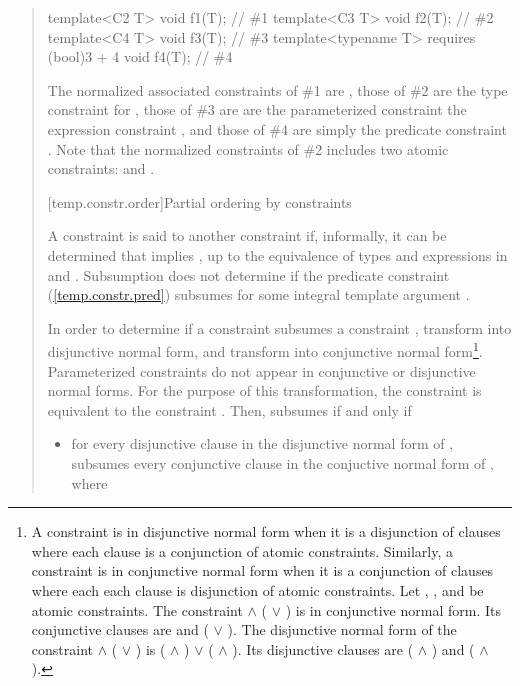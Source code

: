 \begin{quote}
\begin{codeblock}
template<C2 T> void f1(T);                            // \#1
template<C3 T> void f2(T);                            // \#2
template<C4 T> void f3(T);                            // \#3
template<typename T> requires (bool)3 + 4 void f4(T); // \#4
\end{codeblock}
The normalized associated constraints of \#1 are 
,
% 
those of \#2 are the type constraint for ,
%
those of \#3 are are the parameterized constraint
 the expression constraint , and
% 
those of \#4 are simply the predicate constraint .
% 
Note that the normalized constraints of \#2 includes two atomic 
constraints:  and .
\exitexample


[temp.constr.order]{Partial ordering by constraints}

\pnum
A constraint  is said to  another constraint  
if, informally, it can be determined that  implies , up to 
the equivalence of types and expressions in  and .
% 
\enterexample
Subsumption does not determine if the predicate constraint 
 (\ref{temp.constr.pred}) subsumes  for some 
integral template argument .
\exitexample


\pnum
In order to determine if a constraint  subsumes a constraint
, transform  into disjunctive normal form, 
and transform  into conjunctive normal form\footnote{
A constraint is in disjunctive normal form when it is a disjunction of
clauses where each clause is a conjunction of atomic constraints. 
% 
Similarly, a constraint is in conjunctive normal form when it is a conjunction 
of clauses where each each clause is disjunction of atomic constraints.
% 
\enterexample
Let , , and  be atomic constraints.
% 
The constraint  $\land$ ( $\lor$ ) is in 
conjunctive normal form.
% 
Its conjunctive clauses are  and ( $\lor$ ).
% 
The disjunctive normal form of the constraint
 $\land$ ( $\lor$ ) 
is
( $\land$ ) $\lor$ ( $\land$ ).
% 
Its disjunctive clauses are ( $\land$ ) and 
( $\land$ ).
\exitexample
}.
% 
Parameterized constraints do not appear in conjunctive or disjunctive normal
forms. For the purpose of this transformation, the constraint
 is equivalent to the constraint .
% 
Then,  subsumes  if and only if
\begin{itemize}
\item for every disjunctive clause  in the disjunctive normal 
form of ,  subsumes every conjunctive clause  
in the conjuctive normal form of , where


\end{itemize}
\end{quote}
